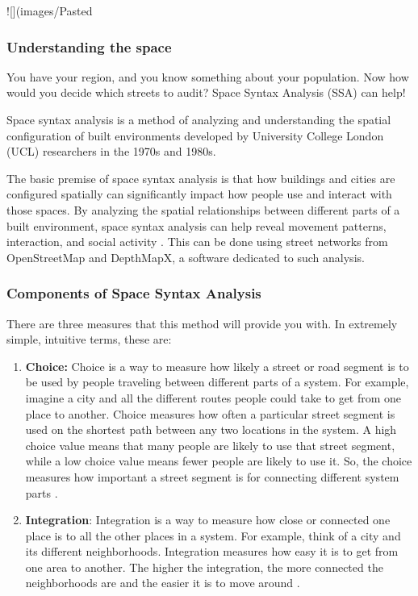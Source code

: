 \documentclass[
]{latex/krantz}
\begin{document}
\begin{center}
![](images/Pasted%
\end{center}

\hypertarget{space-analysis}{%
\subsubsection{Understanding the space}\label{space-analysis}}

You have your region, and you know something about your population. Now how would you decide which streets to audit? Space Syntax Analysis (SSA) can help!

Space syntax analysis is a method of analyzing and understanding the spatial configuration of built environments developed by University College London (UCL) researchers in the 1970s and 1980s.

The basic premise of space syntax analysis is that how buildings and cities are configured spatially can significantly impact how people use and interact with those spaces. By analyzing the spatial relationships between different parts of a built environment, space syntax analysis can help reveal movement patterns, interaction, and social activity \autocite{vannesIntroductionSpaceSyntax2021}. This can be done using street networks from OpenStreetMap and DepthMapX, a software dedicated to such analysis.

\hypertarget{components-ssa}{%
\subsubsection{Components of Space Syntax Analysis}\label{components-ssa}}

There are three measures that this method will provide you with. In extremely simple, intuitive terms, these are:

\begin{enumerate}
\def\labelenumi{\arabic{enumi}.}
\item
  \textbf{Choice:} Choice is a way to measure how likely a street or road segment is to be used by people traveling between different parts of a system. For example, imagine a city and all the different routes people could take to get from one place to another. Choice measures how often a particular street segment is used on the shortest path between any two locations in the system. A high choice value means that many people are likely to use that street segment, while a low choice value means fewer people are likely to use it. So, the choice measures how important a street segment is for connecting different system parts \autocite{hillierSocialLogicSpace1984}.
\item
  \textbf{Integration}: Integration is a way to measure how close or connected one place is to all the other places in a system. For example, think of a city and its different neighborhoods. Integration measures how easy it is to get from one area to another. The higher the integration, the more connected the neighborhoods are and the easier it is to move around \autocite{hillierSocialLogicSpace1984}.
\end{enumerate}
\end{document}
